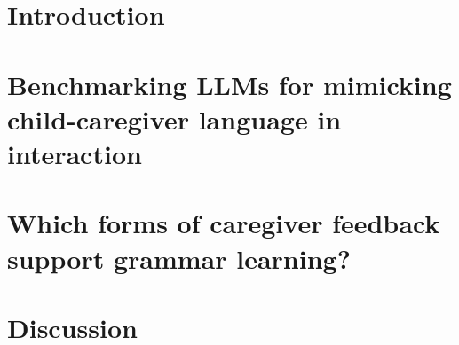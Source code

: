 \section{Introduction}
\begingroup
\demotesectioning

\endgroup


\section{Benchmarking LLMs for mimicking child-caregiver language in interaction}
\label{sec:interaction-benchmark-study}
\publicationnote{\dialoguePublication}
\begingroup
\demotesectioning

\endgroup

\section{Which forms of caregiver feedback support grammar learning?}
\label{sec:caregiver-feedback-study}
\publicationnote{\feedbackPublication}
\begingroup
\demotesectioning

\endgroup

\section{Discussion}
\begingroup
\demotesectioning

\endgroup
